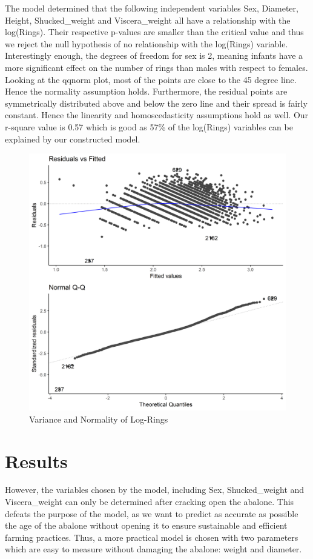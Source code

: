\documentclass[10pt,twocolumn]{article}
\begin{document}
	The model determined that the following independent variables Sex, Diameter, Height, Shucked\_weight and Viscera\_weight all have a relationship with the log(Rings). Their respective p-values are smaller than the critical value and thus we reject the null hypothesis of no relationship with the log(Rings) variable. Interestingly enough, the degrees of freedom for sex is 2, meaning infants have a more significant effect on the number of rings than males with respect to females. Looking at the qqnorm plot, most of the points are close to the 45 degree line. Hence the normality assumption holds. Furthermore, the residual points are symmetrically distributed above and below the zero line and their spread is fairly constant. Hence the linearity and homoscedasticity assumptions hold as well. Our r-square value is 0.57 which is good as 57\% of the log(Rings) variables can be explained by our constructed model.
	
	
	\begin{figure}[!htbp]
		\centering
		\includegraphics[width=0.7\linewidth]{varnorm}
		\caption{Variance and Normality of Log-Rings}
		\label{fig:varnorm}
	\end{figure}
	\vspace{-8mm}	
	
	\section{Results}
		However, the variables chosen by the model, including Sex, Shucked\_weight and Viscera\_weight can only be determined after cracking open the abalone. This defeats the purpose of the model, as we want to predict as accurate as possible the age of the abalone without opening it to ensure sustainable and efficient farming practices. Thus, a more practical model is chosen with two parameters which are easy to measure without damaging the abalone: weight and diameter. 
		
\end{document}
